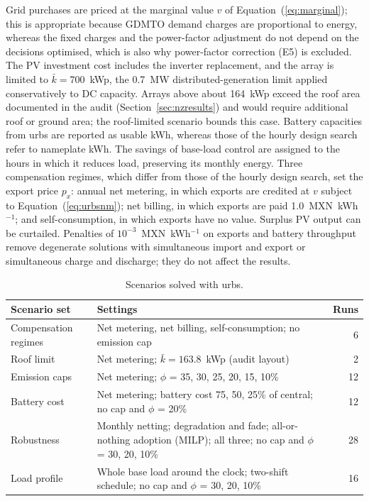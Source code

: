 \documentclass[processes,article,submit,pdftex,moreauthors]{Definitions/mdpi}
\newcommand{\MXN}{MXN}
\begin{document}
Grid purchases are priced at the marginal value $v$ of Equation~(\ref{eq:marginal}); this is appropriate because GDMTO demand charges are proportional to energy, whereas the fixed charges and the power-factor adjustment do not depend on the decisions optimised, which is also why power-factor correction (E5) is excluded. The PV investment cost includes the inverter replacement, and the array is limited to $\bar{k}=700$~kWp, the 0.7~MW distributed-generation limit applied conservatively to DC capacity. Arrays above about 164~kWp exceed the roof area documented in the audit (Section~\ref{sec:nzresults}) and would require additional roof or ground area; the roof-limited scenario bounds this case. Battery capacities from urbs are reported as usable kWh, whereas those of the hourly design search refer to nameplate kWh. The savings of base-load control are assigned to the hours in which it reduces load, preserving its monthly energy. Three compensation regimes, which differ from those of the hourly design search, set the export price $p_x$: annual net metering, in which exports are credited at $v$ subject to Equation~(\ref{eq:urbsnm}); net billing, in which exports are paid 1.0~\MXN~kWh$^{-1}$; and self-consumption, in which exports have no value. Surplus PV output can be curtailed. Penalties of $10^{-3}$~\MXN~kWh$^{-1}$ on exports and battery throughput remove degenerate solutions with simultaneous import and export or simultaneous charge and discharge; they do not affect the results.

\begin{table}[H]
\caption{Scenarios solved with urbs.}
\label{tab:urbsruns}
\footnotesize
\begin{tabularx}{\linewidth}{p{3.2cm}Xr}
\toprule
Scenario set & Settings & Runs \\
\midrule
Compensation regimes & Net metering, net billing, self-consumption; no emission cap & 6 \\
Roof limit & Net metering; $\bar{k}=163.8$~kWp (audit layout) & 2 \\
Emission caps & Net metering; $\phi$ = 35, 30, 25, 20, 15, 10\% & 12 \\
Battery cost & Net metering; battery cost 75, 50, 25\% of central; no cap and $\phi$ = 20\% & 12 \\
Robustness & Monthly netting; degradation and fade; all-or-nothing adoption (MILP); all three; no cap and $\phi$ = 30, 20, 10\% & 28 \\
Load profile & Whole base load around the clock; two-shift schedule; no cap and $\phi$ = 30, 20, 10\% & 16 \\
\bottomrule
\end{tabularx}
\end{table}
\end{document}
